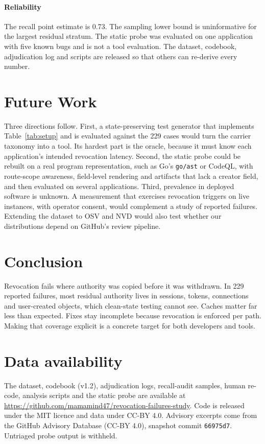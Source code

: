 \documentclass[preprint,12pt]{elsarticle}
\begin{document}
\paragraph{Reliability}
The recall point estimate is 0.73. The sampling lower bound is uninformative for the largest residual stratum.
The static probe was evaluated on one application with five known bugs and is not a tool evaluation.
The dataset, codebook, adjudication log and scripts are released so that others can re-derive every number.

\section{Future Work}
Three directions follow. First, a state-preserving test generator that implements Table~\ref{tab:setup} and is
evaluated against the 229 cases would turn the carrier taxonomy into a tool. Its hardest part is the oracle, because
it must know each application's intended revocation latency. Second, the static probe could be rebuilt on a real
program representation, such as Go's \texttt{go/ast} or CodeQL, with route-scope awareness, field-level rendering and
artifacts that lack a creator field, and then evaluated on several applications. Third, prevalence in deployed
software is unknown. A measurement that exercises revocation triggers on live instances, with operator consent, would
complement a study of reported failures. Extending the dataset to OSV and NVD would also test whether our
distributions depend on GitHub's review pipeline.

\section{Conclusion}
Revocation fails where authority was copied before it was withdrawn. In 229 reported failures, most residual
authority lives in sessions, tokens, connections and user-created objects, which clean-state testing cannot see.
Caches matter far less than expected. Fixes stay incomplete because revocation is enforced per path. Making
that coverage explicit is a concrete target for both developers and tools.

\section*{Data availability}
The dataset, codebook (v1.2), adjudication logs, recall-audit samples, human re-code, analysis scripts and the
static probe are available at \url{https://github.com/mamamind47/revocation-failures-study}. Code is released under the MIT
licence and data under CC-BY 4.0. Advisory excerpts come from the GitHub Advisory Database (CC-BY 4.0), snapshot commit
\texttt{66975d7}. Untriaged probe output is withheld.
\end{document}
